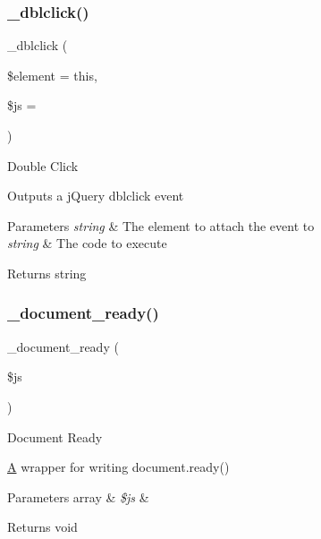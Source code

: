 \subsubsection{\texorpdfstring{\+\_\+dblclick()}{\_dblclick()}}
{\footnotesize\ttfamily \+\_\+dblclick (\begin{DoxyParamCaption}\item[{}]{\$element = {\ttfamily \textquotesingle{}this\textquotesingle{}},  }\item[{}]{\$js = {\ttfamily \textquotesingle{}\textquotesingle{}} }\end{DoxyParamCaption})\hspace{0.3cm}{\ttfamily [protected]}}

Double Click

Outputs a j\+Query dblclick event


\begin{DoxyParams}{Parameters}
{\em string} & The element to attach the event to \\
\hline
{\em string} & The code to execute \\
\hline
\end{DoxyParams}
\begin{DoxyReturn}{Returns}
string 
\end{DoxyReturn}
\mbox{\label{class_c_i___jquery_a5d111acaf02096fa67c90954167c202f}} 
\subsubsection{\texorpdfstring{\+\_\+document\+\_\+ready()}{\_document\_ready()}}
{\footnotesize\ttfamily \+\_\+document\+\_\+ready (\begin{DoxyParamCaption}\item[{}]{\$js }\end{DoxyParamCaption})\hspace{0.3cm}{\ttfamily [protected]}}

Document Ready

\mbox{\hyperlink{class_a}{A}} wrapper for writing document.\+ready()


\begin{DoxyParams}[1]{Parameters}
array & {\em \$js} & \\
\hline
\end{DoxyParams}
\begin{DoxyReturn}{Returns}
void 
\end{DoxyReturn}
\mbox{\label{class_c_i___jquery_a8731ec925abaf39ed5e8635365c6512d}} 
